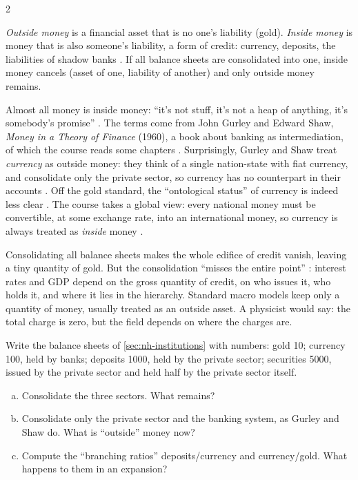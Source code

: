 \begin{paracol}{2}
\begin{definition}\label{def:nh-inside}
\emph{Outside money} is a financial asset that is no one's liability (gold). \emph{Inside money} is money that is
also someone's liability, a form of credit: currency, deposits, the liabilities of shadow banks .
If all balance sheets are consolidated into one, inside money cancels (asset of one, liability of another) and only
outside money remains.
\end{definition}

Almost all money is inside money: ``it's not stuff, it's not a heap of anything, it's somebody's promise''
. The terms come from John Gurley and Edward Shaw, \emph{Money in a Theory of Finance} (1960), a book
about banking as intermediation, of which the course reads some chapters . Surprisingly,
Gurley and Shaw treat \emph{currency} as outside money: they think of a single nation-state with fiat currency, and
consolidate only the private sector, so currency has no counterpart in their accounts . Off the gold
standard, the ``ontological status'' of currency is indeed less clear . The course takes a global view:
every national money must be convertible, at some exchange rate, into an international money, so currency is
always treated as \emph{inside} money .

\begin{intuition}
Consolidating all balance sheets makes the whole edifice of credit vanish, leaving a tiny quantity of gold. But the
consolidation ``misses the entire point'' : interest rates and GDP depend on the gross quantity of
credit, on who issues it, who holds it, and where it lies in the hierarchy. Standard macro models keep only a
quantity of money, usually treated as an outside asset. A physicist would say: the total charge is zero, but the
field depends on where the charges are.
\end{intuition}

\begin{exercise}[Consolidation]
Write the balance sheets of \cref{sec:nh-institutions} with numbers: gold 10; currency 100, held by banks; deposits 1000,
held by the private sector; securities 5000, issued by the private sector and held half by the private sector itself.
\begin{enumerate}[(a)]
  \item Consolidate the three sectors. What remains?
  \item Consolidate only the private sector and the banking system, as Gurley and Shaw do. What is ``outside'' money now?
  \item Compute the ``branching ratios'' deposits/currency and currency/gold. What happens to them in an expansion?
\end{enumerate}
\end{exercise}


\end{paracol}
